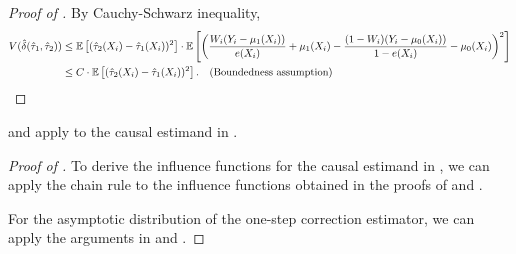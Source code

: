 \begin{proof}[Proof of ]
    By Cauchy-Schwarz inequality, 
    \begin{align*}
        V(\hat{\delta}(\hat{\tau}_1, \hat{\tau}_2))
        &\le \mathbb{E}\left[(\hat{\tau}_2(X_i) - \hat{\tau}_1(X_i))^2\right] \cdot \mathbb{E}\left[\left(\frac{W_i(Y_i - {\mu}_1(X_i))}{{e}(X_i)} + {\mu}_1(X_i) - \frac{(1-W_i)(Y_i - {\mu}_0(X_i))}{1-{e}(X_i)} - {\mu}_0(X_i)\right)^2\right] \\
        &\le C \cdot \mathbb{E}\left[(\hat{\tau}_2(X_i) - \hat{\tau}_1(X_i))^2\right].  \quad (\text{Boundedness assumption})
    \end{align*}
\end{proof}


\begin{corollary}[DINA]\label{prop:DINA}
     and  apply to the causal estimand in .
\end{corollary}

\begin{proof}[Proof of ]

    To derive the influence functions for the causal estimand in , we can apply the chain rule to the influence functions obtained in the proofs of  and . 

    For the asymptotic distribution of the one-step correction estimator, we can apply the arguments in  and .
\end{proof}

